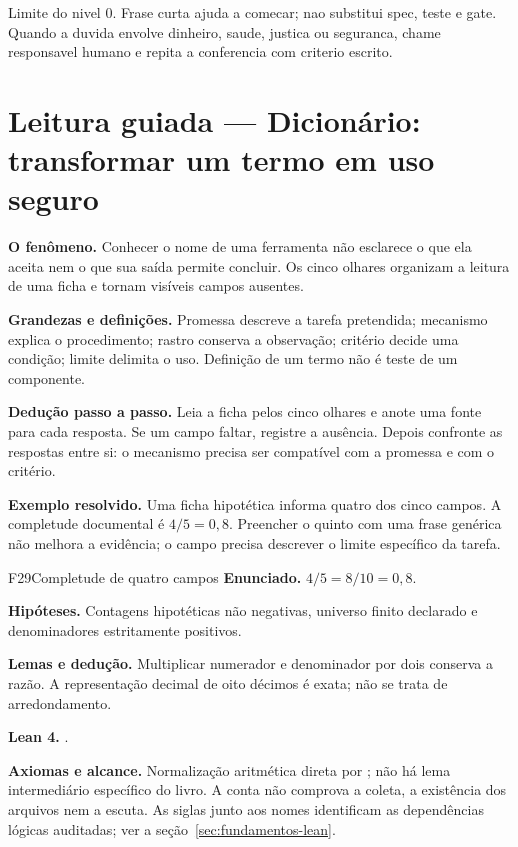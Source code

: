 \begin{aviso}
Limite do nivel 0. Frase curta ajuda a comecar; nao substitui spec, teste e gate. Quando a duvida envolve dinheiro, saude, justica ou seguranca, chame responsavel humano e repita a conferencia com criterio escrito.
\end{aviso}


\section[Leitura guiada]{Leitura guiada — Dicionário: transformar um termo em uso seguro}
\begin{descricao}
\textbf{O fenômeno.} Conhecer o nome de uma ferramenta não esclarece o que ela aceita nem o que sua saída permite concluir. Os cinco olhares organizam a leitura de uma ficha e tornam visíveis campos ausentes.
\end{descricao}

\begin{definicao}
\textbf{Grandezas e definições.} Promessa descreve a tarefa pretendida; mecanismo explica o procedimento; rastro conserva a observação; critério decide uma condição; limite delimita o uso. Definição de um termo não é teste de um componente.
\end{definicao}

\begin{metodo}
\textbf{Dedução passo a passo.} Leia a ficha pelos cinco olhares e anote uma fonte para cada resposta. Se um campo faltar, registre a ausência. Depois confronte as respostas entre si: o mecanismo precisa ser compatível com a promessa e com o critério.
\end{metodo}

\begin{resultado}
\textbf{Exemplo resolvido.} Uma ficha hipotética informa quatro dos cinco campos. A completude documental é $4/5=0{,}8$. Preencher o quinto com uma frase genérica não melhora a evidência; o campo precisa descrever o limite específico da tarefa.
\end{resultado}
\begin{formalizacao}{F29}{Completude de quatro campos}
\textbf{Enunciado.} $4/5=8/10=0{,}8$.

\textbf{Hipóteses.} Contagens hipotéticas não negativas, universo finito declarado e denominadores estritamente positivos.

\textbf{Lemas e dedução.} Multiplicar numerador e denominador por dois conserva a razão. A representação decimal de oito décimos é exata; não se trata de arredondamento.

\textbf{Lean 4.} .

\textbf{Axiomas e alcance.} Normalização aritmética direta por ; não há lema intermediário específico do livro. A conta não comprova a coleta, a existência dos arquivos nem a escuta. As siglas junto aos nomes identificam as dependências lógicas auditadas; ver a seção~\ref{sec:fundamentos-lean}.
\end{formalizacao}


